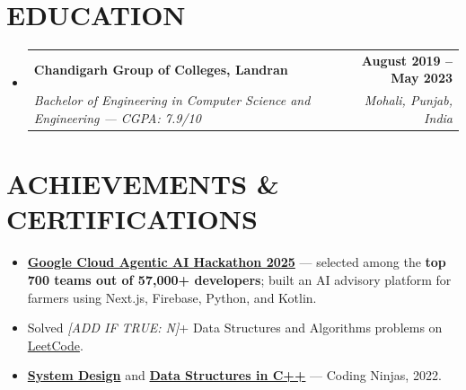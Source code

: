 \documentclass[letterpaper,11pt]{article}
\makeatletter
\newcommand{\resumeItem}[1]{\item\small{{#1 \vspace{-2pt}}}}
\newcommand{\resumeSubheading}[4]{
  \vspace{-2pt}\item
    \begin{tabular*}{1.0\textwidth}[t]{l@{\extracolsep{\fill}}r}
      \textbf{\large#1} & \textbf{\small #2} \\
      \textit{\small#3} & \textit{\small #4} \\
    \end{tabular*}\vspace{-7pt}
}
\newcommand{\resumeSubHeadingListStart}{\begin{itemize}[leftmargin=0.0in, label={}]}
\newcommand{\resumeSubHeadingListEnd}{\end{itemize}}
\newcommand{\resumeItemListStart}{\begin{itemize}}
\newcommand{\resumeItemListEnd}{\end{itemize}\vspace{-5pt}}
\makeatother
\begin{document}
\section{EDUCATION}
  \resumeSubHeadingListStart
    \resumeSubheading
      {Chandigarh Group of Colleges, Landran}{August 2019 -- May 2023}
      {Bachelor of Engineering in Computer Science and Engineering — CGPA: 7.9/10}{Mohali, Punjab, India}
  \resumeSubHeadingListEnd

\vspace{-6pt}

\section{ACHIEVEMENTS \& CERTIFICATIONS}
    \vspace{2pt}
    \resumeItemListStart
        \resumeItem{\textbf{\href{https://github.com/abhikumar002/Agentic-Gig-Project}{Google Cloud Agentic AI Hackathon 2025}} — selected among the \textbf{top 700 teams out of 57,000+ developers}; built an AI advisory platform for farmers using Next.js, Firebase, Python, and Kotlin.}
        \resumeItem{Solved \textit{[ADD IF TRUE: N]}+ Data Structures and Algorithms problems on \href{https://leetcode.com/u/sachinkumar6174/}{LeetCode}.}
        \resumeItem{\textbf{\href{http://ninjasfiles.s3.amazonaws.com/certificate18894980e4209379ac28665887f78da42bac5c2.pdf}{System Design}} and \textbf{\href{https://ninjasfiles.s3.amazonaws.com/certificate19853580c201378561a01f48ae87f59e9220db2.pdf}{Data Structures in C++}} — Coding Ninjas, 2022.}
    \resumeItemListEnd
\end{document}
